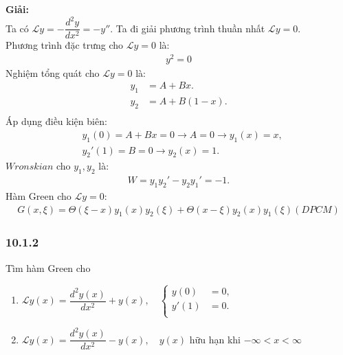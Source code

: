 \documentclass{report}
\begin{document}
\textbf{Giải:}\\
Ta có $\mathcal{L} y = -\dfrac{d^2 y}{dx^2}  = -y''$. Ta đi giải phương trình thuần nhất $\mathcal{L} y = 0$.\\
Phương trình đặc trưng cho $\mathcal{L} y = 0$ là:
\begin{align*}
	y^2 = 0
\end{align*}
Nghiệm tổng quát cho $\mathcal{L} y = 0$ là:
\begin{align*}
	y_1 & = A + Bx.     \\
	y_2 & = A + B(1-x). \\
\end{align*}
Áp dụng điều kiện biên:
\begin{align*}
	 & y_1(0) = A + Bx = 0 \rightarrow A = 0 \rightarrow y_1(x) = x, \\
	 & y_{2}{'}(1) = B = 0 \rightarrow y_2(x) = 1.
\end{align*}
$Wronskian$ cho $y_1,y_2$ là:
\begin{align*}
	W = y_{1} y_{2}' - y_{2} y_{1}' = -1.
\end{align*}
Hàm Green cho $\mathcal{L} y = 0$:
\begin{align*}
	G(x,\xi)  = \Theta(\xi - x) y_1(x)y_2(\xi) + \Theta(x - \xi) y_2(x)y_1(\xi) (DPCM)
\end{align*}
\subsubsection{10.1.2}
Tìm hàm Green cho
\begin{enumerate}[label=(\alph*)]
	\item $\mathcal{L} y(x) = \dfrac{d^2 y(x)}{dx^2} + y(x) ,\quad
		      \begin{cases}
			      y(0)  & = 0, \\
			      y'(1) & = 0. \\
		      \end{cases}$
	\item  $\mathcal{L} y(x) = \dfrac{d^2 y(x)}{dx^2} - y(x) , \quad y(x)$ hữu hạn khi $-\infty < x < \infty$\\
\end{enumerate}
\end{document}
